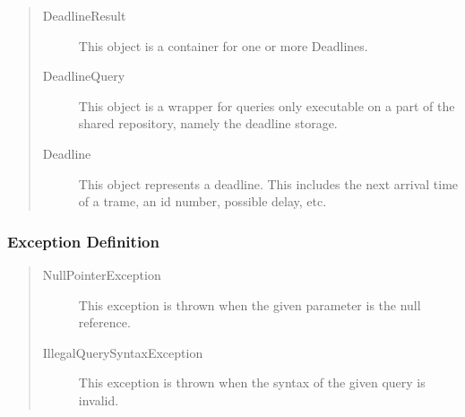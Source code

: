 \begin{quote}
	\begin{description}
		\item[DeadlineResult] This object is a container for one or more Deadlines. 
		\item[DeadlineQuery] This object is a wrapper for queries only executable on a
		part of the shared repository, namely the deadline storage.
		\item[Deadline] This object represents a deadline. This includes the next
		arrival time of a trame, an id number, possible delay, etc.
	\end{description} 
\end{quote}

\subsubsection{Exception Definition} 

\begin{quote}
	\begin{description}
		\item[NullPointerException] This exception is thrown when the given parameter
		is the null reference.
		\item[IllegalQuerySyntaxException] This exception is thrown when the syntax of
		the given query is invalid.
	\end{description} 
\end{quote}